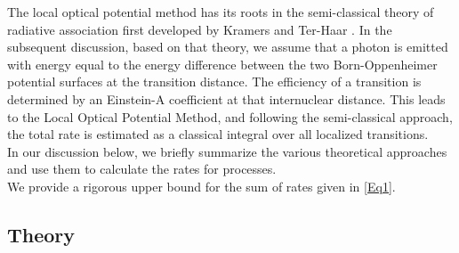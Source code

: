 The local optical potential method has its roots in the semi-classical theory of radiative association first developed by Kramers and Ter-Haar \cite{KramersTerHaar1946}.  In the subsequent discussion, based on that theory, we assume that a photon is emitted with energy equal to the energy difference between the two Born-Oppenheimer potential surfaces at the transition distance. The eﬃciency of a transition is determined by an Einstein-A coeﬃcient at that internuclear distance.
This leads to the Local Optical Potential Method, and following the semi-classical approach, the total rate is estimated as a classical integral over all localized transitions.\\

In our discussion below, we briefly summarize the various theoretical approaches and use them to calculate the rates for processes.\\
We provide a rigorous upper bound for the sum of rates given in \eqref{Eq1}.

\subsection{Theory}
\label{chap:RxRP}

